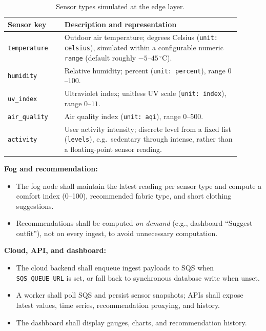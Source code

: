 \documentclass[conference]{IEEEtran}
\begin{document}
\begin{table}[htbp]
\centering
\caption{Sensor types simulated at the edge layer.}
\label{tab:sensortypes}
\begin{tabular}{@{}p{0.22\linewidth}p{0.68\linewidth}@{}}
\toprule
\textbf{Sensor key} & \textbf{Description and representation} \\
\midrule
\texttt{temperature} & Outdoor air temperature; degrees Celsius (\texttt{unit: celsius}), simulated within a configurable numeric \texttt{range} (default roughly $-5$--$45\,^{\circ}\mathrm{C}$). \\
\texttt{humidity} & Relative humidity; percent (\texttt{unit: percent}), range $0$--$100$. \\
\texttt{uv\_index} & Ultraviolet index; unitless UV scale (\texttt{unit: index}), range $0$--$11$. \\
\texttt{air\_quality} & Air quality index (\texttt{unit: aqi}), range $0$--$500$. \\
\texttt{activity} & User activity intensity; discrete level from a fixed list (\texttt{levels}), e.g.\ sedentary through intense, rather than a floating-point sensor reading. \\
\bottomrule
\end{tabular}
\end{table}

\textbf{Fog and recommendation:}
\begin{itemize}
  \item The fog node shall maintain the latest reading per sensor type and compute a comfort index (0--100), recommended fabric type, and short clothing suggestions.
  \item Recommendations shall be computed \emph{on demand} (e.g., dashboard ``Suggest outfit''), not on every ingest, to avoid unnecessary computation.
\end{itemize}

\textbf{Cloud, API, and dashboard:}
\begin{itemize}
  \item The cloud backend shall enqueue ingest payloads to SQS when \texttt{SQS\_QUEUE\_URL} is set, or fall back to synchronous database write when unset.
  \item A worker shall poll SQS and persist sensor snapshots; APIs shall expose latest values, time series, recommendation proxying, and history.
  \item The dashboard shall display gauges, charts, and recommendation history.
\end{itemize}
\end{document}
